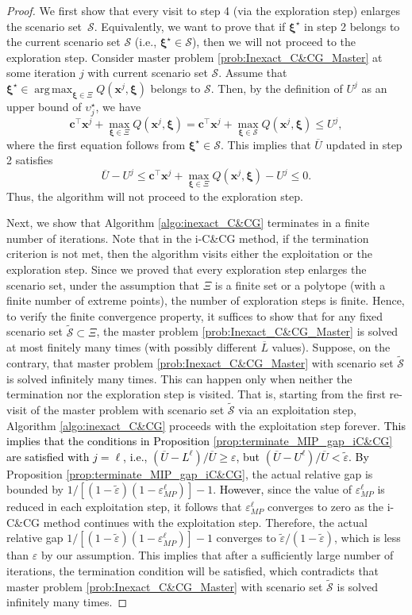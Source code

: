 \documentclass[preprint,review,11pt]{elsarticle}
\theoremstyle{definition}
\theoremstyle{remark}
\DeclareMathOperator*{\argmax}{arg\,max}
\newcommand{\tp}{\top}
\newcommand{\epst}{\widetilde{\varepsilon}}
\newcommand{\calS}{\mathcal{S}}
\newcommand{\xb}{\pmb{x}}
\newcommand{\cb}{\pmb{c}}
\newcommand{\xib}{\pmb{\xi}}
\newcommand{\Lbar}{\overline{L}}
\newcommand{\Ubar}{\overline{U}}
\newcommand{\calSt}{\widetilde{\mathcal{S}}}
\newcommand{\blue}{\textcolor{black}}
\begin{document}
\begin{proof}
We first show that every visit to step 4 (via the exploration step) enlarges the scenario set~$\calS$. Equivalently, we want to prove that if $\xib^\star$ in step 2 belongs to the current scenario set $\calS$ (i.e., $\xib^\star\in\calS$), then we will not proceed to the exploration step. Consider master problem \eqref{prob:Inexact_C&CG_Master} at some iteration $j$ with current scenario set $\calS$. Assume that $\xib^\star\in\argmax_{\xib\in\Xi} Q(\xb^j,\xib)$ belongs to $\calS$. Then, by the definition of $U^j$ as an upper bound of $\upsilon^\star_j$, we have
%
$$\cb^\tp\xb^j + \max_{\xib\in\Xi} Q(\xb^j,\xib)  =\cb^\tp\xb^j + \max_{\xib\in\calS} Q(\xb^j,\xib) \leq U^j,$$
%
where the first equation follows from $\xib^\star\in\calS$. This implies that $\Ubar$ updated in step 2 satisfies
%
$$\Ubar-U^j \leq \cb^\tp\xb^j + \max_{\xib\in\Xi} Q(\xb^j,\xib) - U^j \leq 0. $$
%
Thus, the algorithm will not proceed to the exploration step.

Next, we show that Algorithm \ref{algo:inexact_C&CG} terminates in a finite number of iterations. Note that in the i-C\&CG method, if the termination criterion is not met, then the algorithm visits either the exploitation or the exploration step. Since we proved that every exploration step enlarges the scenario set, under the assumption that $\Xi$ is a finite set or a polytope (with a finite number of extreme points), the number of exploration steps is finite. Hence, to verify the finite convergence property, it suffices to show that for any fixed scenario set $\calSt\subset\Xi$, the master problem \eqref{prob:Inexact_C&CG_Master} is solved at most finitely many times (with possibly different $\Lbar$ values). Suppose, on the contrary, that master problem \eqref{prob:Inexact_C&CG_Master} with scenario set $\calSt$ is solved infinitely many times. This can happen only when neither the termination nor the exploration step is visited. That is, starting from the first re-visit of the master problem with scenario set $\calSt$ via an exploitation step, Algorithm \ref{algo:inexact_C&CG} proceeds with the exploitation step forever. \blue{This implies that the conditions in Proposition \ref{prop:terminate_MIP_gap_iC&CG} are satisfied with $j=\ell$, i.e., $(\Ubar-L^\ell)/\Ubar\geq \varepsilon$, but $(\Ubar-U^\ell)/\Ubar<\epst$. By} Proposition \ref{prop:terminate_MIP_gap_iC&CG}, the actual relative gap is bounded by $1/[(1-\epst)(1-\varepsilon_{MP}^\ell)]-1$.  \blue{However,} since the value of $\varepsilon^\ell_{MP}$ is reduced in each exploitation step, it follows that $\varepsilon^\ell_{MP}$ converges to zero as the i-C\&CG method continues with the exploitation step. Therefore, the actual relative gap $1/[(1-\epst)(1-\varepsilon_{MP}^\ell)]-1$ converges to $\epst/(1-\epst)$, which is less than $\varepsilon$ by our assumption. This implies that after a sufficiently large number of iterations, the termination condition will be satisfied, which contradicts that master problem \eqref{prob:Inexact_C&CG_Master} with scenario set $\calSt$ is solved infinitely many times.
\end{proof}
\end{document}
